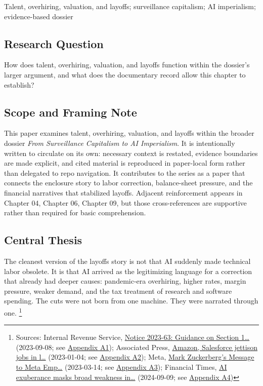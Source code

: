 \documentclass[
  american,
  11pt,
  letterpaper,
]{article}
\begin{document}
Talent, overhiring, valuation, and layoffs; surveillance capitalism; AI
imperialism; evidence-based dossier

\subsection{Research Question}\label{research-question-5}

How does talent, overhiring, valuation, and layoffs function within the
dossier's larger argument, and what does the documentary record allow
this chapter to establish?

\subsection{Scope and Framing Note}\label{scope-and-framing-note-5}

This paper examines talent, overhiring, valuation, and layoffs within
the broader dossier \emph{From Surveillance Capitalism to AI
Imperialism}. It is intentionally written to circulate on its own:
necessary context is restated, evidence boundaries are made explicit,
and cited material is reproduced in paper-local form rather than
delegated to repo navigation. It contributes to the series as a paper
that connects the enclosure story to labor correction, balance-sheet
pressure, and the financial narratives that stabilized layoffs. Adjacent
reinforcement appears in Chapter 04, Chapter 06, Chapter 09, but those
cross-references are supportive rather than required for basic
comprehension.

\subsection{Central Thesis}\label{central-thesis-5}

The cleanest version of the layoffs story is not that AI suddenly made
technical labor obsolete. It is that AI arrived as the legitimizing
language for a correction that already had deeper causes: pandemic-era
overhiring, higher rates, margin pressure, weaker demand, and the tax
treatment of research and software spending. The cuts were not born from
one machine. They were narrated through one. \footnote{Sources: Internal
  Revenue Service,
  \href{https://www.irs.gov/pub/irs-drop/n-23-63.pdf}{Notice 2023-63:
  Guidance on Section 1\ldots{}} (2023-09-08; see
  \hyperref[ch-05-appendix-a1-notice-2023-63-guidance-on-section-174-and-specified-research-or-experimental-expenditures]{Appendix
  A1}); Associated Press,
  \href{https://apnews.com/article/bbb2f3a09eafdfc7cda54a3b87e538ad}{Amazon,
  Salesforce jettison jobs in l\ldots{}} (2023-01-04; see
  \hyperref[ch-05-appendix-a2-amazon-salesforce-jettison-jobs-in-latest-tech-worker-purge]{Appendix
  A2}); Meta,
  \href{https://about.fb.com/news/2023/03/mark-zuckerberg-meta-year-of-efficiency/}{Mark
  Zuckerberg's Message to Meta Emp\ldots{}} (2023-03-14; see
  \hyperref[ch-05-appendix-a3-mark-zuckerberg-s-message-to-meta-employees]{Appendix
  A3}); Financial Times,
  \href{https://www.ft.com/content/0b14d871-2d19-46f1-9660-5466301e8066}{AI
  exuberance masks broad weakness in\ldots{}} (2024-09-09; see
  \hyperref[ch-05-appendix-a4-ai-exuberance-masks-broad-weakness-in-tech-sector-say-investors]{Appendix
  A4})}
\end{document}
